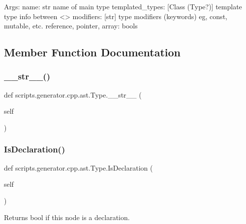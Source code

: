 \begin{DoxyVerb}Args:
  name: str name of main type
  templated_types: [Class (Type?)] template type info between <>
  modifiers: [str] type modifiers (keywords) eg, const, mutable, etc.
  reference, pointer, array: bools
\end{DoxyVerb}
 

\subsection{Member Function Documentation}
\mbox{\label{classscripts_1_1generator_1_1cpp_1_1ast_1_1_type_a15541ed15fd31658d8bd9f9a4984c662}} 
\subsubsection{\texorpdfstring{\_\_str\_\_()}{\_\_str\_\_()}}
{\footnotesize\ttfamily def scripts.\+generator.\+cpp.\+ast.\+Type.\+\_\+\+\_\+str\+\_\+\+\_\+ (\begin{DoxyParamCaption}\item[{}]{self }\end{DoxyParamCaption})}

\mbox{\label{classscripts_1_1generator_1_1cpp_1_1ast_1_1_type_a91fb3784f75055327235157cdf98ea38}} 
\subsubsection{\texorpdfstring{IsDeclaration()}{IsDeclaration()}}
{\footnotesize\ttfamily def scripts.\+generator.\+cpp.\+ast.\+Type.\+Is\+Declaration (\begin{DoxyParamCaption}\item[{}]{self }\end{DoxyParamCaption})}

\begin{DoxyVerb}Returns bool if this node is a declaration.\end{DoxyVerb}
 

